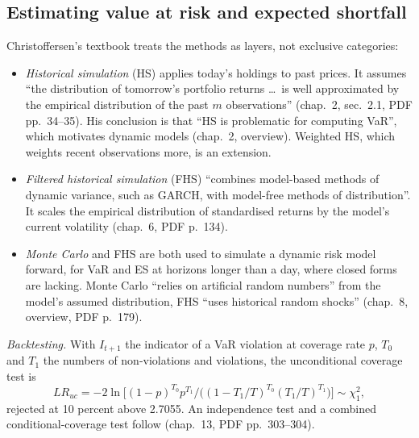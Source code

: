 \subsection{Estimating value at risk and expected shortfall}

\begin{qfmethod}\label{meth:var-es-estimation-methods}
 Christoffersen's textbook \citep[2nd ed., 2012]{wide-christoffersen-elements} treats the methods as layers, not exclusive categories:
\begin{itemize}
\item \emph{Historical simulation} (HS) applies today's holdings to past prices. It assumes ``the distribution of tomorrow's portfolio returns \dots\ is well approximated by the empirical distribution of the past $m$ observations'' (chap.~2, sec.~2.1, PDF pp.~34--35). His conclusion is that ``HS is problematic for computing VaR'', which motivates dynamic models (chap.~2, overview). Weighted HS, which weights recent observations more, is an extension.
\item \emph{Filtered historical simulation} (FHS) ``combines model-based methods of dynamic variance, such as GARCH, with model-free methods of distribution''. It scales the empirical distribution of standardised returns by the model's current volatility (chap.~6, PDF p.~134).
\item \emph{Monte Carlo} and FHS are both used to simulate a dynamic risk model forward, for VaR and ES at horizons longer than a day, where closed forms are lacking. Monte Carlo ``relies on artificial random numbers'' from the model's assumed distribution, FHS ``uses historical random shocks'' (chap.~8, overview, PDF p.~179).
\end{itemize}
\emph{Backtesting.} With $I_{t+1}$ the indicator of a VaR violation at coverage rate $p$, $T_0$ and $T_1$ the numbers of non-violations and violations, the unconditional coverage test is
\[ LR_{uc}=-2\ln\big[(1-p)^{T_0}p^{T_1}\big/\big((1-T_1/T)^{T_0}(T_1/T)^{T_1}\big)\big]\sim\chi^2_1, \]
rejected at 10 percent above 2.7055. An independence test and a combined conditional-coverage test follow (chap.~13, PDF pp.~303--304).


\end{qfmethod}
